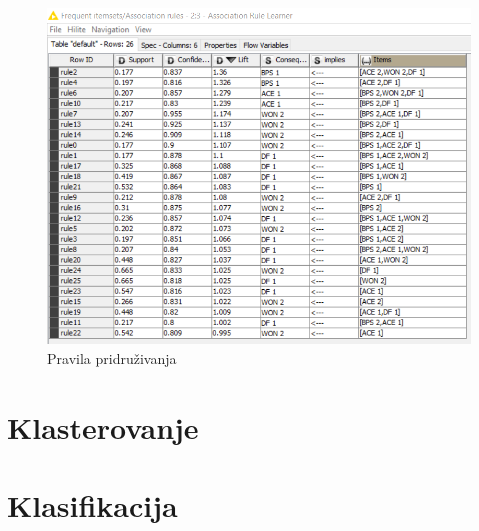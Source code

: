 \documentclass[a4paper]{article}
\begin{document}
\begin{figure}[h!]
	\begin{center}
		\includegraphics[scale=0.6]{KNIME_project/PravilaPridruzivanja/rule_learner_2009}
	\end{center}
	\caption{Pravila pridruživanja}
	\label{fig:rule_learner}
\end{figure}




\section{Klasterovanje}

\section{Klasifikacija}
\end{document}
